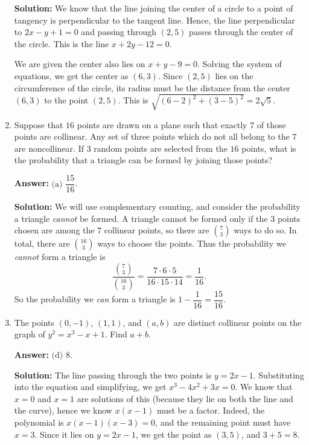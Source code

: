 \documentclass[11pt,paper=letter]{scrartcl}
\begin{document}
\begin{enumerate}[left=0pt]
\textbf{Solution:} We know that the line joining the center of a circle to a point of tangency is perpendicular to the tangent line. Hence, the line perpendicular to $2x - y + 1 = 0$ and passing through $(2, 5)$ passes through the center of the circle. This is the line $x + 2y - 12 = 0$.

We are given the center also lies on $x + y - 9 = 0$. Solving the system of equations, we get the center as $(6, 3)$. Since $(2, 5)$ lies on the circumference of the circle, its radius must be the distance from the center $(6, 3)$ to the point $(2, 5)$. This is $\sqrt{(6-2)^2 + (3-5)^2} = 2\sqrt5$.

\item Suppose that $16$ points are drawn on a plane such that exactly $7$ of those points are collinear. Any set of three points which do not all belong to the $7$ are noncollinear. If $3$ random points are selected from the $16$ points, what is the probability that a triangle can be formed by joining those points?


\textbf{Answer:} $\boxed{\text{(a) }\dfrac{15}{16}}$.

\textbf{Solution:} We will use complementary counting, and consider the probability a triangle \emph{cannot} be formed. A triangle cannot be formed only if the $3$ points chosen are among the $7$ collinear points, so there are $\binom73$ ways to do so. In total, there are $\binom{16}3$ ways to choose the points. Thus the probability we \emph{cannot} form a triangle is $$\frac{\binom73}{\binom{16}3} = \frac{7\cdot 6\cdot 5}{16 \cdot 15 \cdot 14} = \frac1{16}.$$ So the probability we \emph{can} form a triangle is $1 - \dfrac1{16} = \dfrac{15}{16}$.

\item The points $(0, -1)$, $(1, 1)$, and $(a, b)$ are distinct collinear points on the graph of $y^2 = x^3 - x + 1$. Find $a + b$.


\textbf{Answer:} $\boxed{\text{(d) }8}$.

\textbf{Solution:} The line passing through the two points is $y = 2x - 1$. Substituting into the equation and simplifying, we get $x^3 - 4x^2 + 3x = 0$. We know that $x = 0$ and $x = 1$ are solutions of this (because they lie on both the line and the curve), hence we know $x(x-1)$ must be a factor. Indeed, the polynomial is $x(x-1)(x-3) = 0$, and the remaining point must have $x = 3$. Since it lies on $y = 2x - 1$, we get the point as $(3, 5)$, and $3+5 =8$. 


\end{enumerate}
\end{document}
